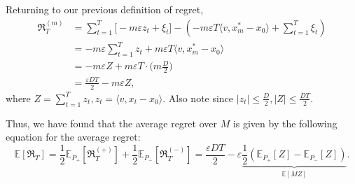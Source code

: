 \documentclass[journal,onecolumn]{IEEEtran}
\theoremstyle{plain}
\theoremstyle{definition}
\theoremstyle{remark}
\newcommand{\regret}{\mathfrak{R}}
\begin{document}
{Returning to our previous definition of regret,
\begin{align*}
\regret_T^{(m)} &= \sum_{t=1}^T \Big[ -m\varepsilon z_t + \xi_t \Big] - \left(-m\varepsilon T\langle v,x_m^*-x_0\rangle + \sum_{t=1}^T\xi_t\right) \\
&= -m\varepsilon \sum_{t=1}^T z_t + m\varepsilon T \langle v ,x_m^* - x_0\rangle \\
&= -m\varepsilon Z + m\varepsilon T\cdot \Big(m\frac{D}{2}\Big) \\&= \frac{\varepsilon DT}{2} - m\varepsilon Z ,
\end{align*}
where $ Z = \sum_{t=1}^{T}z_t , z_t = \langle v,x_t - x_0\rangle$. Also note since $|z_t| \leq \frac{D}{2} , |Z| \leq \frac{DT}{2}$.

Thus, we have found that the average regret over $M$ is given by the following equation for the average regret:
\begin{equation*}
\mathbb{E}[\regret_T]
= \frac{1}{2} \mathbb{E}_{P_+}\left[\regret_T^{(+)}\right] + \frac{1}{2} \mathbb{E}_{P_-}\left[\regret_T^{(-)}\right]
= \frac{\varepsilon D T}{2} - \varepsilon \underbrace{\frac{1}{2}\left( \mathbb{E}_{P_+}[Z] - \mathbb{E}_{P_-}[Z]\right)}_{\mathbb{E}[M Z]}.
\end{equation*}

}
\end{document}
